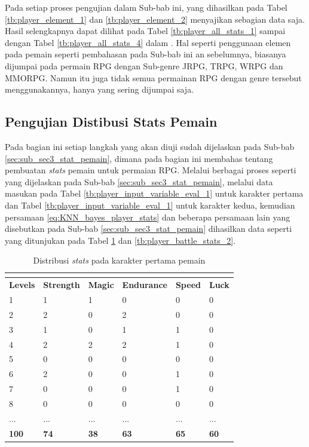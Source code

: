 Pada setiap proses pengujian dalam Sub-bab ini, yang dihasilkan pada Tabel \ref{tb:player_element_1} dan \ref{tb:player_element_2} menyajikan sebagian data saja. Hasil selengkapnya dapat dilihat pada Tabel \ref{tb:player_all_stats_1} sampai dengan Tabel \ref{tb:player_all_stats_4} dalam . Hal seperti penggunaan elemen pada pemain seperti pembahasan pada Sub-bab ini an sebelumnya, biasanya dijumpai pada permain RPG dengan Sub-genre JRPG, TRPG, WRPG dan MMORPG. Namun itu juga tidak semua permainan RPG dengan genre tersebut menggunakannya, hanya yang sering dijumpai saja.
\vspace{1ex}

\subsection{Pengujian Distibusi Stats Pemain}
\label{sec:sub_sec4_eval_multi-character_stats}
\vspace{1ex}

Pada bagian ini setiap langkah yang akan diuji sudah dijelaskan pada Sub-bab \ref{sec:sub_sec3_stat_pemain}, dimana pada bagian ini membahas tentang pembuatan \textit{stats} pemain untuk permaian RPG. Melalui berbagai proses seperti yang dijelaskan pada Sub-bab \ref{sec:sub_sec3_stat_pemain}, melalui data masukan pada Tabel \ref{tb:player_input_variable_eval_1} untuk karakter pertama dan Tabel \ref{tb:player_input_variable_eval_1} untuk karakter kedua, kemudian persamaan \ref{eq:KNN_bayes_player_stats} dan beberapa persamaan lain yang disebutkan pada Sub-bab \ref{sec:sub_sec3_stat_pemain} dihasilkan data seperti yang ditunjukan pada Tabel \ref{tb:player_battle_stats_1} dan \ref{tb:player_battle_stats_2}.
\vspace{-1ex}

\begin{longtable}{|l|l|l|l|l|l|}
	\caption{Distribusi \textit{stats} pada karakter pertama pemain}
	\vspace{1ex}
	\label{tb:player_battle_stats_1}\\
	\hline
	\rowcolor[HTML]{C0C0C0} 
	\textbf{Levels} & \textbf{Strength} & \textbf{Magic} & \textbf{Endurance} & \textbf{Speed} & \textbf{Luck} \\ \hline
	1 & 1 & 1 & 0 & 0 & 0 \\ \hline
	2 & 2 & 0 & 2 & 0 & 0 \\ \hline
	3 & 1 & 0 & 1 & 1 & 0 \\ \hline
	4 & 2 & 2 & 2 & 1 & 0 \\ \hline
	5 & 0 & 0 & 0 & 0 & 0 \\ \hline
	6 & 2 & 0 & 0 & 1 & 0 \\ \hline
	7 & 0 & 0 & 0 & 1 & 0 \\ \hline
	8 & 0 & 0 & 0 & 0 & 0 \\ \hline
	... & ... & ... & ... & ... & ... \\ \hline
	\textbf{100} & \textbf{74} & \textbf{38} & \textbf{63} & \textbf{65} & \textbf{60} \\ \hline
\end{longtable}


